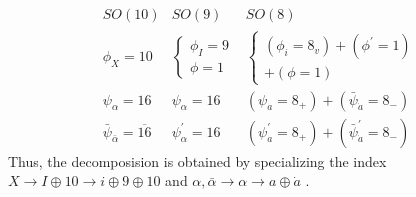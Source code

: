\begin{equation}
\begin{array}{ccc}
SO(10) & SO(9)
\begin{array}{l}
\\
\end{array}
& SO(8) \\
\phi _X=10 & \left\{
\begin{array}{l}
\phi _I=9 \\
\phi =1
\end{array}
\right. & \left\{
\begin{array}{l}
\left( \phi _i=8_v\right) +\left( \phi ^{\prime }=1\right) \\
+\left( \phi =1\right)
\end{array}
\right. \\
\psi _\alpha =16 & \psi _\alpha =16 & \left( \psi _a=8_{+}\right) +\left(
\bar \psi _{\dot a}=8_{-}\right) \\
\bar \psi _{\bar \alpha }=\overline{16} & \psi _\alpha ^{\prime }=16 &
\left( \psi _a^{\prime }=8_{+}\right) +\left( \bar \psi _{\dot a}^{\prime
}=8_{-}\right)
\end{array}
\end{equation}
Thus, the decomposision is obtained by specializing the index $X\rightarrow
I\oplus 10\rightarrow i\oplus 9\oplus 10$ and $\alpha ,\bar \alpha
\rightarrow \alpha \rightarrow a\oplus \dot a$ .

